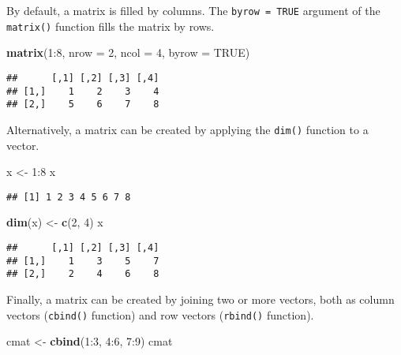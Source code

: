 \documentclass[]{book}
\newenvironment{Shaded}{\begin{snugshade}}{\end{snugshade}}
\newcommand{\KeywordTok}[1]{\textcolor[rgb]{0.13,0.29,0.53}{\textbf{{#1}}}}
\newcommand{\DataTypeTok}[1]{\textcolor[rgb]{0.13,0.29,0.53}{{#1}}}
\newcommand{\DecValTok}[1]{\textcolor[rgb]{0.00,0.00,0.81}{{#1}}}
\newcommand{\StringTok}[1]{\textcolor[rgb]{0.31,0.60,0.02}{{#1}}}
\newcommand{\OtherTok}[1]{\textcolor[rgb]{0.56,0.35,0.01}{{#1}}}
\newcommand{\NormalTok}[1]{{#1}}
\begin{document}
By default, a matrix is filled by columns. The \texttt{byrow\ =\ TRUE}
argument of the \texttt{matrix()} function fills the matrix by rows.

\begin{Shaded}
\begin{Highlighting}[]
\KeywordTok{matrix}\NormalTok{(}\DecValTok{1}\NormalTok{:}\DecValTok{8}\NormalTok{, }\DataTypeTok{nrow =} \DecValTok{2}\NormalTok{, }\DataTypeTok{ncol =} \DecValTok{4}\NormalTok{, }\DataTypeTok{byrow =} \OtherTok{TRUE}\NormalTok{)}
\end{Highlighting}
\end{Shaded}

\begin{verbatim}
##      [,1] [,2] [,3] [,4]
## [1,]    1    2    3    4
## [2,]    5    6    7    8
\end{verbatim}

Alternatively, a matrix can be created by applying the \texttt{dim()}
function to a vector.

\begin{Shaded}
\begin{Highlighting}[]
\NormalTok{x <-}\StringTok{ }\DecValTok{1}\NormalTok{:}\DecValTok{8}
\NormalTok{x}
\end{Highlighting}
\end{Shaded}

\begin{verbatim}
## [1] 1 2 3 4 5 6 7 8
\end{verbatim}

\begin{Shaded}
\begin{Highlighting}[]
\KeywordTok{dim}\NormalTok{(x) <-}\StringTok{ }\KeywordTok{c}\NormalTok{(}\DecValTok{2}\NormalTok{, }\DecValTok{4}\NormalTok{)}
\NormalTok{x}
\end{Highlighting}
\end{Shaded}

\begin{verbatim}
##      [,1] [,2] [,3] [,4]
## [1,]    1    3    5    7
## [2,]    2    4    6    8
\end{verbatim}

Finally, a matrix can be created by joining two or more vectors, both as
column vectors (\texttt{cbind()} function) and row vectors
(\texttt{rbind()} function).

\begin{Shaded}
\begin{Highlighting}[]
\NormalTok{cmat <-}\StringTok{ }\KeywordTok{cbind}\NormalTok{(}\DecValTok{1}\NormalTok{:}\DecValTok{3}\NormalTok{, }\DecValTok{4}\NormalTok{:}\DecValTok{6}\NormalTok{, }\DecValTok{7}\NormalTok{:}\DecValTok{9}\NormalTok{)}
\NormalTok{cmat}
\end{Highlighting}
\end{Shaded}
\end{document}

